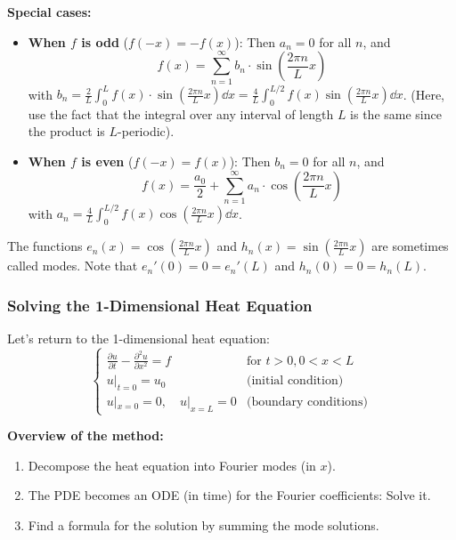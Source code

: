 \textbf{Special cases:}
\begin{itemize}
    \item \textbf{When $f$ is odd} ($f(-x) = -f(x)$): Then $a_n = 0$ for all $n$, and
    $$f(x) = \sum_{n=1}^\infty b_n \cdot \sin\left(\frac{2\pi n}{L} x\right)$$
    with $b_n = \frac{2}{L} \int_0^L f(x) \cdot \sin\left(\frac{2\pi n}{L} x\right) \dd x = \frac{4}{L} \int_0^{L/2} f(x) \sin\left(\frac{2\pi n}{L} x\right) \dd x$.
    (Here, use the fact that the integral over any interval of length $L$ is the same since the product is $L$-periodic).
    
    \item \textbf{When $f$ is even} ($f(-x) = f(x)$): Then $b_n = 0$ for all $n$, and
    $$f(x) = \frac{a_0}{2} + \sum_{n=1}^\infty a_n \cdot \cos\left(\frac{2\pi n}{L} x\right)$$
    with $a_n = \frac{4}{L} \int_0^{L/2} f(x) \cos\left(\frac{2\pi n}{L} x\right) \dd x$.
\end{itemize}

The functions $e_n(x) = \cos(\frac{2\pi n}{L}x)$ and $h_n(x) = \sin(\frac{2\pi n}{L}x)$ are sometimes called modes. Note that $e_n'(0) = 0 = e_n'(L)$ and $h_n(0) = 0 = h_n(L)$.

\newpage

\subsubsection{Solving the 1-Dimensional Heat Equation}

Let's return to the 1-dimensional heat equation:
\begin{equation}
\begin{cases}
\frac{\partial u}{\partial t} - \frac{\partial^2 u}{\partial x^2} = f & \text{for } t > 0, 0 < x < L \\
u|_{t=0} = u_0 & \text{(initial condition)} \\
u|_{x=0} = 0, \quad u|_{x=L} = 0 & \text{(boundary conditions)}
\end{cases}
\end{equation}

\textbf{Overview of the method:}
\begin{enumerate}
    \item Decompose the heat equation into Fourier modes (in $x$).
    \item The PDE becomes an ODE (in time) for the Fourier coefficients: Solve it.
    \item Find a formula for the solution by summing the mode solutions.
\end{enumerate}

